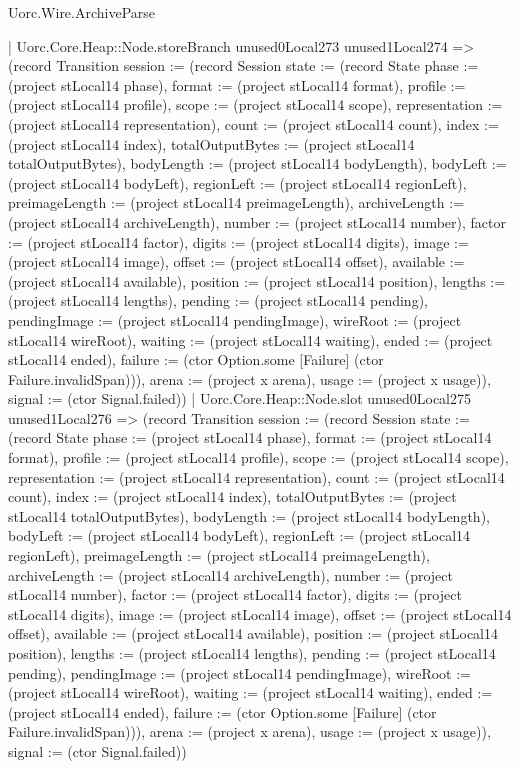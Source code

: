 \begin{lexlean}{Uorc.Wire.ArchiveParse}
\begin{semanticmodule}
{            | Uorc.Core.Heap::Node.storeBranch unused0Local273 unused1Local274 => (record Transition {session := (record Session {state := (record State {phase := (project stLocal14 phase), format := (project stLocal14 format), profile := (project stLocal14 profile), scope := (project stLocal14 scope), representation := (project stLocal14 representation), count := (project stLocal14 count), index := (project stLocal14 index), totalOutputBytes := (project stLocal14 totalOutputBytes), bodyLength := (project stLocal14 bodyLength), bodyLeft := (project stLocal14 bodyLeft), regionLeft := (project stLocal14 regionLeft), preimageLength := (project stLocal14 preimageLength), archiveLength := (project stLocal14 archiveLength), number := (project stLocal14 number), factor := (project stLocal14 factor), digits := (project stLocal14 digits), image := (project stLocal14 image), offset := (project stLocal14 offset), available := (project stLocal14 available), position := (project stLocal14 position), lengths := (project stLocal14 lengths), pending := (project stLocal14 pending), pendingImage := (project stLocal14 pendingImage), wireRoot := (project stLocal14 wireRoot), waiting := (project stLocal14 waiting), ended := (project stLocal14 ended), failure := (ctor Option.some [Failure] (ctor Failure.invalidSpan))}), arena := (project x arena), usage := (project x usage)}), signal := (ctor Signal.failed)})
            | Uorc.Core.Heap::Node.slot unused0Local275 unused1Local276 => (record Transition {session := (record Session {state := (record State {phase := (project stLocal14 phase), format := (project stLocal14 format), profile := (project stLocal14 profile), scope := (project stLocal14 scope), representation := (project stLocal14 representation), count := (project stLocal14 count), index := (project stLocal14 index), totalOutputBytes := (project stLocal14 totalOutputBytes), bodyLength := (project stLocal14 bodyLength), bodyLeft := (project stLocal14 bodyLeft), regionLeft := (project stLocal14 regionLeft), preimageLength := (project stLocal14 preimageLength), archiveLength := (project stLocal14 archiveLength), number := (project stLocal14 number), factor := (project stLocal14 factor), digits := (project stLocal14 digits), image := (project stLocal14 image), offset := (project stLocal14 offset), available := (project stLocal14 available), position := (project stLocal14 position), lengths := (project stLocal14 lengths), pending := (project stLocal14 pending), pendingImage := (project stLocal14 pendingImage), wireRoot := (project stLocal14 wireRoot), waiting := (project stLocal14 waiting), ended := (project stLocal14 ended), failure := (ctor Option.some [Failure] (ctor Failure.invalidSpan))}), arena := (project x arena), usage := (project x usage)}), signal := (ctor Signal.failed)})
}
\end{semanticmodule}
\end{lexlean}
